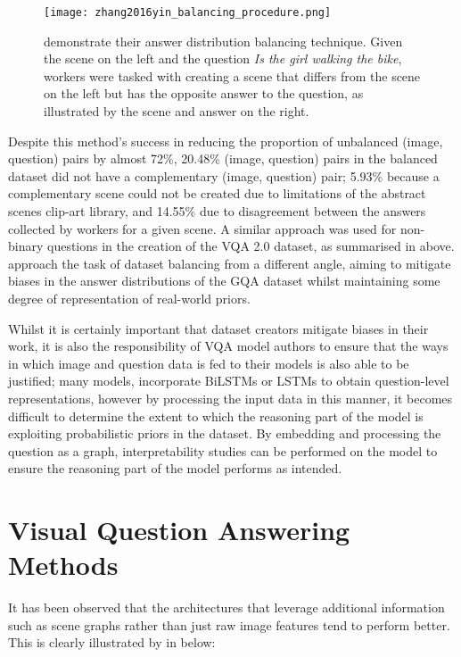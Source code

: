 \begin{figure}[H]
    \centering
    \texttt{[image: zhang2016yin\_balancing\_procedure.png]}
    \caption{\citeauthor{zhang2016yin} demonstrate their answer distribution balancing technique. Given the scene on the left and the question \textit{Is the girl walking the bike}, workers were tasked with creating a scene that differs from the scene on the left but has the opposite answer to the question, as illustrated by the scene and answer on the right.}
    \label{fig:zhang2016yin_balancing_procedure}
\end{figure}

Despite this method's success in reducing the proportion of unbalanced (image, question) pairs by almost 72\%, 20.48\% (image, question) pairs in the balanced dataset did not have a complementary (image, question) pair; 5.93\% because a complementary scene could not be created due to limitations of the abstract scenes clip-art library, and 14.55\% due to disagreement between the answers collected by workers for a given scene. A similar approach was used for non-binary questions in the creation of the VQA 2.0 dataset, as summarised in \tableautorefname{  \ref{tab:dataset_comparison}} above. \citeauthor{hudson2019gqa} approach the task of dataset balancing from a different angle, aiming to mitigate biases in the answer distributions of the GQA dataset whilst maintaining some degree of representation of real-world priors.

Whilst it is certainly important that dataset creators mitigate biases in their work, it is also the responsibility of VQA model authors to ensure that the ways in which image and question data is fed to their models is also able to be justified; many models,  incorporate BiLSTMs \cite{hudson2018compositional} or LSTMs \cite{andreas2016neural} to obtain question-level representations, however by processing the input data in this manner, it becomes difficult to determine the extent to which the reasoning part of the model is exploiting probabilistic priors in the dataset. By embedding and processing the question as a graph, interpretability studies can be performed on the model to ensure the reasoning part of the model performs as intended.

\section{Visual Question Answering Methods}
\label{section:vqa_methods}

It has been observed that the architectures that leverage additional information such as scene graphs rather than just raw image features tend to perform better. This is clearly illustrated by \citeauthor{hudson2019gqa_preprint} in \figureautorefname{ \ref{fig:gqa_input_representation}} below:


